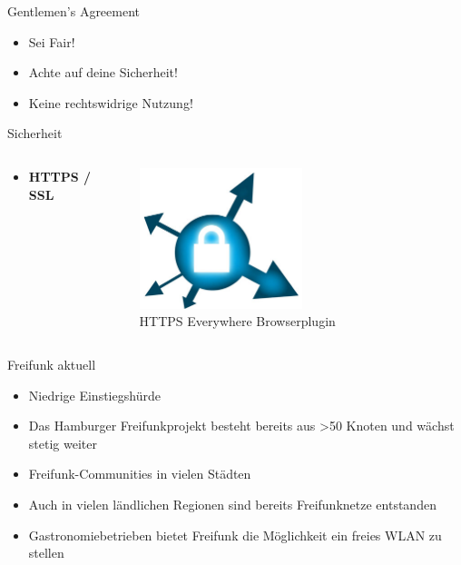 \documentclass[c]{beamer}
\begin{document}
\begin{frame}{Gentlemen's Agreement}
	\begin{itemize}
		\item Sei Fair!
		\item Achte auf deine Sicherheit!
		\item Keine rechtswidrige Nutzung!
	\end{itemize}
\end{frame}

\begin{frame}{Sicherheit}
	\begin{columns}[c]
		\begin{column}{0.5\textwidth}
			\begin{itemize}
				\item \textbf{HTTPS / SSL}
			\end{itemize}
		\end{column}
		\begin{column}{0.5\textwidth}
			\begin{center}
				\includegraphics[width=0.5\textwidth]{httpseverywhere}\\
				HTTPS Everywhere Browserplugin
			\end{center}
		\end{column}
	\end{columns}
\end{frame}

\begin{frame}{Freifunk aktuell}
	\begin{itemize}
		\item Niedrige Einstiegshürde
		\item Das Hamburger Freifunkprojekt besteht bereits aus >50 Knoten und wächst stetig weiter
		\item Freifunk-Communities in vielen Städten
		\item Auch in vielen ländlichen Regionen sind bereits Freifunknetze entstanden
		\item Gastronomiebetrieben bietet Freifunk die Möglichkeit ein freies WLAN zu stellen
	\end{itemize}
\end{frame}
\end{document}
